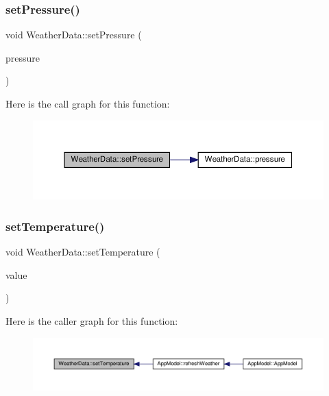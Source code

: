 \subsubsection{\texorpdfstring{set\+Pressure()}{setPressure()}}
{\footnotesize\ttfamily void Weather\+Data\+::set\+Pressure (\begin{DoxyParamCaption}\item[{const Q\+String \&}]{pressure }\end{DoxyParamCaption})}

Here is the call graph for this function\+:\nopagebreak
\begin{figure}[H]
\begin{center}
\leavevmode
\includegraphics[width=350pt]{class_weather_data_ad5b453016656864e2bc3a09fc75919a0_cgraph}
\end{center}
\end{figure}
\mbox{\label{class_weather_data_afee514cbb8713059cf8d0602b33cadf5}} 
\subsubsection{\texorpdfstring{set\+Temperature()}{setTemperature()}}
{\footnotesize\ttfamily void Weather\+Data\+::set\+Temperature (\begin{DoxyParamCaption}\item[{const Q\+String \&}]{value }\end{DoxyParamCaption})}

Here is the caller graph for this function\+:\nopagebreak
\begin{figure}[H]
\begin{center}
\leavevmode
\includegraphics[width=350pt]{class_weather_data_afee514cbb8713059cf8d0602b33cadf5_icgraph}
\end{center}
\end{figure}
\mbox{\label{class_weather_data_a68686722f2e0bbf5cb28f0fdc96e280d}} 
